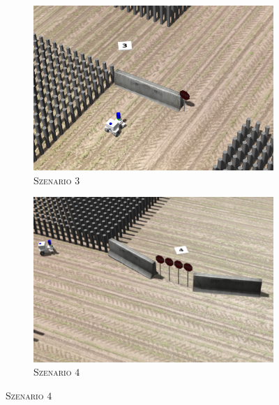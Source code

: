 \documentclass{beamer}
\begin{document}
\begin{frame}
\begin{figure}[H]
\begin{subfigure}[b]{0.24\textwidth}
        \centering
        \includegraphics[width=\textwidth]{img/static_3.png}
        \caption{\textsc{Szenario $3$}}
        \label{fig:static_3}
    \end{subfigure}
    \hfill
    \begin{subfigure}[b]{0.24\textwidth}
        \centering
        \includegraphics[width=\textwidth]{img/static_4.png}
        \caption{\textsc{Szenario $4$}}
        \label{fig:static_4}
    \end{subfigure}
  \end{figure}
  \begin{figure}[H]
    \centering
    \begin{subfigure}[b]{0.24\textwidth}
        \centering

\end{subfigure}
\end{figure}
\end{frame}
\end{document}
